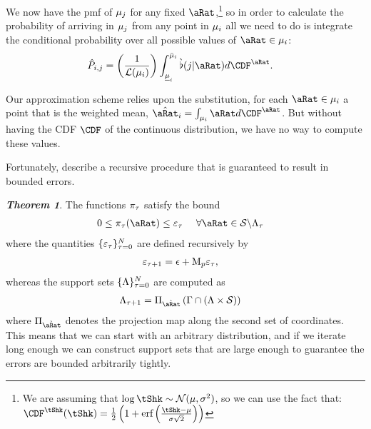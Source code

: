 \documentclass[\econtexRoot/BufferStockTheory.tex]{subfiles}
\begin{document}
We now have the {pmf} of $\mu_{j}$ for any fixed $\pnt$,\footnote{We are assuming that $\log \tShk \sim \mathcal{N}(\mu,\sigma^{2})$, so we can use the fact that:
  $\CDF^{\tShk}(\tShk) = \frac{1}{2}\left(1+\erf\left(\frac{\tShk-\mu}{\sigma \sqrt{2}}\right)\right)$
} so in order to calculate the probability of arriving in $\mu_j$ from any point in $\mu_i$ all we need to do is integrate the conditional probability over all possible values of $\pnt \in \SetPartCnts_{\thisBin}$:
\begin{align}
  \TnsMrkv_{\thisBin,\thatBin} &=\left(\frac{1}{\Lebes(\SetPartCnts_{\thisBin})}\right) \int_{\Bot{\SetPartCnts}_{\thisBin}}^{\Top{\SetPartCnts}_\thisBin} \Nxt{\PrbBinNxtFmPntNow}(\thatBin|\pnt) d\CDF^{\pnt}. \label{eq:PTrns}
\end{align}

Our approximation scheme relies upon the substitution, for each $\pnt \in \SetPartCnts_{i}$ a point that is the weighted mean, $\hat{\pnt}_{\thisBin} = \int_{\SetPartCnts_{i}}\pnt d\CDF^{\pnt}$.  But without having the CDF $\CDF$ of the continuous distribution, we have no way to compute these values.

Fortunately, \cite{saDiscrete} describe a recursive procedure that is guaranteed to result in bounded errors.

\textit{\textbf{Theorem 1}}. The functions $\pi_{\tau}$ satisfy the bound
\begin{align}
  0 & \leq \DnsPnt_{\tAbs}(\pnt) \leq \varepsilon_{\tAbs}~~~~\forall \pnt \in \SetFullCnts \backslash \SetTrncCnts_{\tAbs}
\end{align}
\noindent where the quantities $\{\varepsilon_{\tau}\}_{\tau=0}^{N}$ are defined recursively by
\begin{align}
  \varepsilon_{\tau+1} &= \epsilon + \mathrm{M}_{p}\varepsilon_{\tau},
\end{align}
whereas the support sets $\{\Lambda\}_{\tau=0}^{N}$ are computed as
\begin{align}
  \SetTrncCnts_{\tAbs+1} &= \Pi_{\Nxt{\pnt}}\left(\KrnPntNxtFmPntNowSetSprtTrnc \cap (\SetTrncCnts \times \SetFullCnts)\right)
\end{align}
where $\Pi_{\Nxt{\pnt}}$ denotes the projection map along the second set of coordinates.
This means that we can start with an arbitrary distribution, and if we iterate long enough we can construct support sets that are large enough to guarantee the errors are bounded arbitrarily tightly.
\end{document}
